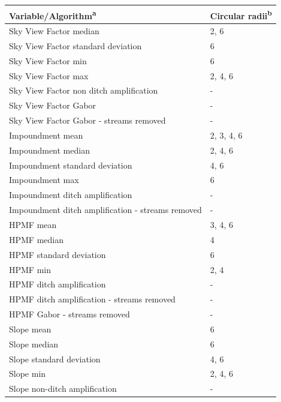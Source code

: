\documentclass[]{interact}
\theoremstyle{plain}%
\theoremstyle{definition}
\theoremstyle{remark}
\begin{document}
\begin{table} [!htb]
    {\begin{tabular}{ll} \toprule
      Variable/Algorithm\textsuperscript{a} & Circular radii\textsuperscript{b} \\ \midrule
      
      Sky View Factor median &2, 6 \\
      Sky View Factor standard deviation & 6 \\
      Sky View Factor min & 6 \\
      Sky View Factor max & 2, 4, 6 \\
      Sky View Factor non ditch amplification & - \\ 
      Sky View Factor Gabor & - \\
      Sky View Factor Gabor - streams removed & -\\
      
      Impoundment mean & 2, 3, 4, 6 \\
      Impoundment median & 2, 4, 6 \\
      Impoundment standard deviation & 4, 6 \\
      Impoundment max & 6 \\
      Impoundment ditch amplification & - \\
      Impoundment ditch amplification - streams removed & - \\
      
      HPMF mean & 3, 4, 6 \\
      HPMF median & 4 \\
      HPMF standard deviation & 6 \\
      HPMF min & 2, 4 \\
      HPMF ditch amplification & - \\
      HPMF ditch amplification - streams removed & - \\
      HPMF Gabor - streams removed & -\\
      
      Slope mean & 6 \\
      Slope median & 6 \\
      Slope standard deviation & 4, 6 \\
      Slope min & 2, 4, 6 \\
      Slope non-ditch amplification & - \\ \bottomrule
    \end{tabular}}
    \label{featuretable}
\end{table}
\end{document}
